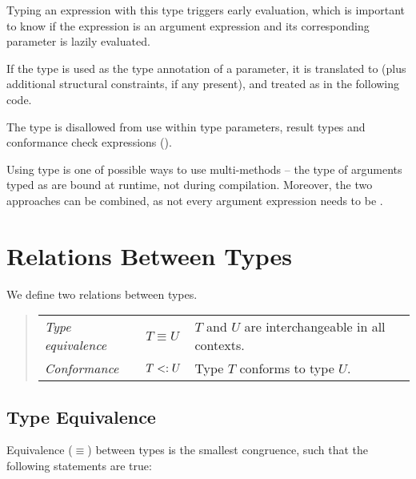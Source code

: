 Typing an expression with this type triggers early evaluation, which is important to know if the expression is an argument expression and its corresponding parameter is lazily evaluated. 

If the  type is used as the type annotation of a parameter, it is translated to  (plus additional structural constraints, if any present), and treated as  in the following code.

The  type is disallowed from use within type parameters, result types and conformance check expressions (). 

Using  type is one of possible ways to use multi-methods -- the type of arguments typed as  are bound at runtime, not during compilation. Moreover, the two approaches can be combined, as not every argument expression needs to be . 








\section{Relations Between Types}

We define two relations between types. 
\begin{quote}\begin{tabular}{l@{\gap}l@{\gap}l}
\em Type equivalence & $T \equiv U$ & $T$ and $U$ are interchangeable
in all contexts.
\\
\em Conformance & $T <: U$ & Type $T$ conforms to type $U$.
\end{tabular}\end{quote}






\subsection{Type Equivalence}

Equivalence ($\equiv$) between types is the smallest congruence, such that the following statements are true:

